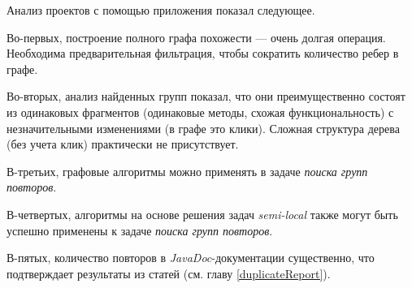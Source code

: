 Анализ проектов с помощью приложения показал следующее.

Во-первых, построение полного графа похожести --- очень долгая операция.
Необходима предварительная фильтрация, чтобы сократить количество ребер в графе. 

Во-вторых, анализ найденных  групп показал, что они преимущественно состоят из одинаковых фрагментов (одинаковые методы, схожая функциональность) с незначительными изменениями (в графе это клики).
Сложная структура дерева (без учета клик) практически не присутствует.

В-третьих, графовые алгоритмы можно применять в задаче \emph{поиска групп повторов}.

В-четвертых, алгоритмы на основе решения задач \emph{semi-local} также могут быть успешно применены к задаче \emph{поиска групп повторов}.

В-пятых, количество повторов в \emph{JavaDoc}-документации существенно, что подтверждает результаты из статей (см. главу \ref{duplicateReport}).
